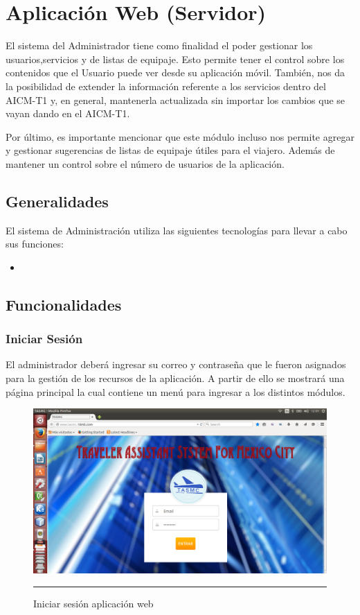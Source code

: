 \section{Aplicación Web (Servidor)}

El sistema del Administrador tiene como finalidad el poder gestionar los usuarios,servicios y de listas de equipaje.
Esto permite tener el control sobre los contenidos que el Usuario puede ver desde su aplicación móvil. También, nos da la posibilidad
de extender la información referente a los servicios dentro del AICM-T1 y, en general, mantenerla actualizada sin importar los cambios
que se vayan dando en el AICM-T1.

Por último, es importante mencionar que este módulo incluso nos permite agregar y gestionar sugerencias de listas de equipaje útiles 
para el viajero. Además de mantener un control sobre el número de usuarios de la aplicación.

\subsection{Generalidades}
El sistema de Administración utiliza las siguientes tecnologías para llevar a cabo sus funciones:
\begin{itemize}
 \item 
\end{itemize}

\subsection{Funcionalidades}

\subsubsection{Iniciar Sesión}
El administrador deberá ingresar su correo y contraseña que le fueron asignados para la gestión de los recursos de la aplicación. A partir 
de ello se mostrará una página principal la cual contiene un menú para ingresar a los distintos módulos.

\begin{figure}[h!]
	\centering
		\includegraphics[width=1\textwidth]{Figuras/principalTASMC.png}
		\rule{35em}{0.5pt}
	\caption[Iniciar sesión aplicación web]{Iniciar sesión aplicación web}
	\label{fig:vistaInicio}
\end{figure}
\clearpage

